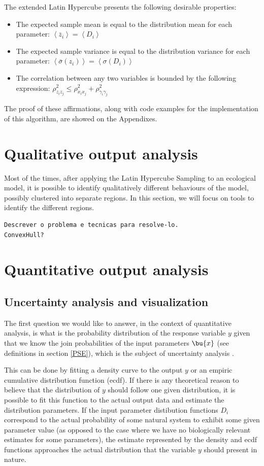 \begin{theorem}
	The extended Latin Hypercube presents the following desirable 
	properties:
	\begin{itemize}
		\item The expected sample mean is equal to the distribution mean
			for each parameter: 
			$ \left< \bar z_i \right> = \left< D_i \right>$
		\item The expected sample variance is equal to the distribution 
			variance for each parameter:
			$ \left< \bar \sigma(z_i) \right> = \left< \sigma(D_i) \right> $
		\item The correlation between any two variables is 
			bounded by the following expression:
			$ \rho^2_{z_iz_j} \leq \rho^2_{x_ix_j} + \rho^2_{\gamma_i\gamma_j} $
	\end{itemize}
	\label{ASR}
\end{theorem}

The proof of these affirmations, along with code examples for the implementation
of this algorithm, are showed on the Appendixes.

\section{Qualitative output analysis}\label{QualAnal}
Most of the times, after applying the Latin Hypercube Sampling to an 
ecological model, it is possible to identify qualitatively different 
behaviours of the model, possibly clustered into separate regions. In this
section, we will focus on tools to identify the different regions.
\begin{verbatim}
Descrever o problema e tecnicas para resolve-lo.
ConvexHull?
\end{verbatim}
\section{Quantitative output analysis}\label{QuantAnal}
\subsection{Uncertainty analysis and visualization}
The first question we would like to answer, in the context of quantitative 
analysis, is what is the probability distribution of the response variable $y$
given that we know the join probabilities of the input parameters $\bu{x}$ 
(see definitions in section \ref{PSE}), which is the subject of uncertainty
analysis \cite{Helton03}. 

This can be done by fitting a density curve to the output $y$ or an empiric
cumulative distribution function (ecdf). If there is any theoretical reason
to believe that the distribution of $y$ should follow one given distribution,
it is possible to fit this function to the actual output data and estimate
the distribution parameters. If the input parameter distibution functions $D_i$
correspond to the actual probability of some natural system to exhibit some
given parameter value (as opposed to the case where we have no biologically 
relevant estimates for some parameters), the estimate represented by the
density and ecdf functions approaches the actual distribution that the
variable $y$ should present in nature. 

